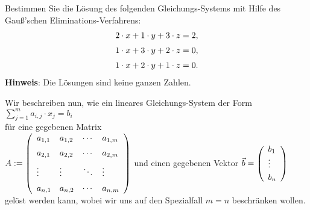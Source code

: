 \exercise
Bestimmen  Sie die Lösung des folgenden Gleichungs-Systems mit Hilfe des Gauß'schen
Eliminations-Verfahrens:
\begin{equation*}
\begin{array}[c]{l}
  2 \cdot x + 1 \cdot y + 3 \cdot z = 2, \\[0.2cm]
  1 \cdot x + 3 \cdot y + 2 \cdot z = 0, \\[0.2cm]
  1 \cdot x + 2 \cdot y + 1 \cdot z = 0.
\end{array}
\end{equation*}
\textbf{Hinweis}: Die Lösungen sind keine ganzen Zahlen.
\vspace*{0.3cm}

Wir beschreiben nun, wie ein lineares Gleichungs-System der Form
\\[0.2cm]
\hspace*{1.3cm}
$\sum\limits_{j=1}^m a_{i,j} \cdot x_j = b_i$
\\[0.2cm]
für eine  gegebenen Matrix 
\\[0.2cm]
\hspace*{1.3cm}
$A := \left(
  \begin{array}[c]{ll c l}
    a_{1,1} & a_{1,2} & \cdots & a_{1,m} \\[0.2cm]
    a_{2,1} & a_{2,2} & \cdots & a_{2,m} \\[0.2cm]
    \vdots  & \vdots  & \ddots & \vdots  \\[0.2cm]
    a_{n,1} & a_{n,2} & \cdots & a_{n,m} 
  \end{array}
 \right)
$
\quad und einen gegebenen Vektor \quad
$\vec{b} = \left(
  \begin{array}[c]{l}
     b_1    \\
     \vdots \\[0.1cm]
     b_n       
  \end{array}
 \right)
$
\\[0.2cm]
gelöst werden kann, wobei wir uns auf den Spezialfall $m=n$ beschränken wollen.
